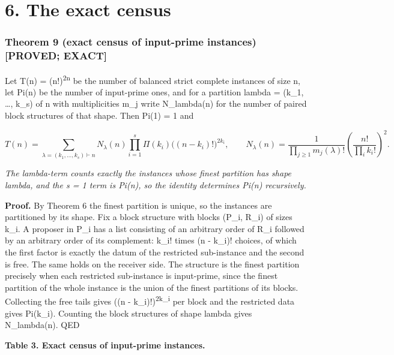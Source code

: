 \documentclass[
  11pt,
]{article}
\begin{document}
\clearpage

\hypertarget{the-exact-census}{%
\section{6. The exact census}\label{the-exact-census}}

\hypertarget{theorem-9-exact-census-of-input-prime-instances-proved-exact}{%
\subsubsection{Theorem 9 (exact census of input-prime instances)
{[}PROVED;
EXACT{]}}\label{theorem-9-exact-census-of-input-prime-instances-proved-exact}}

Let T(n) = (n!)\textsuperscript{2n} be the number of balanced strict
complete instances of size n, let Pi(n) be the number of input-prime
ones, and for a partition lambda = (k\_1, \ldots, k\_s) of n with
multiplicities m\_j write N\_lambda(n) for the number of paired block
structures of that shape. Then Pi(1) = 1 and

\[
T(n)=\sum_{\lambda=(k_1,\dots ,k_s)\vdash n} N_\lambda(n)\prod_{i=1}^{s}\Pi(k_i)\big((n-k_i)!\big)^{2k_i},\qquad N_\lambda(n)=\frac{1}{\prod_{j\ge 1}m_j(\lambda)!}\left(\frac{n!}{\prod_i k_i!}\right)^{2}.
\]

\emph{The lambda-term counts exactly the instances whose finest
partition has shape lambda, and the s = 1 term is Pi(n), so the identity
determines Pi(n) recursively.}

\textbf{Proof.} By Theorem 6 the finest partition is unique, so the
instances are partitioned by its shape. Fix a block structure with
blocks (P\_i, R\_i) of sizes k\_i. A proposer in P\_i has a list
consisting of an arbitrary order of R\_i followed by an arbitrary order
of its complement: k\_i! times (n - k\_i)! choices, of which the first
factor is exactly the datum of the restricted sub-instance and the
second is free. The same holds on the receiver side. The structure is
the finest partition precisely when each restricted sub-instance is
input-prime, since the finest partition of the whole instance is the
union of the finest partitions of its blocks. Collecting the free tails
gives ((n - k\_i)!)\textsuperscript{2k\_i} per block and the restricted
data gives Pi(k\_i). Counting the block structures of shape lambda gives
N\_lambda(n). QED

\textbf{Table 3. Exact census of input-prime instances.}
\end{document}
